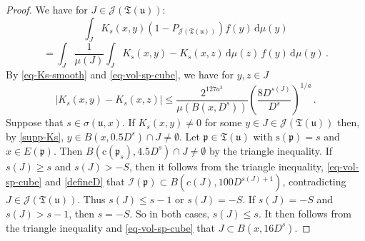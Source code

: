 \documentclass[10pt,a4paper]{article}
\theoremstyle{plain}
\theoremstyle{definition}
\numberwithin{equation}{subsection}
\newcommand{\fp}{{\mathfrak p}}
\newcommand{\fu}{{\mathfrak u}}
\newcommand{\fT}{{\mathfrak T}}
\newcommand{\pc}{{\mathrm{c}}}
\newcommand{\ps}{{\mathrm{s}}}
\newcommand{\scI}{{\mathcal{I}}} %
\newcommand{\leanok}{}
\begin{document}
\begin{proof}
    \leanok
    We have for $J \in \mathcal{J}(\fT(\fu))$:
    $$
        \int_J K_{s}(x,y)(1 - P_{\mathcal{J}(\fT(\fu))})f(y) \, \mathrm{d}\mu(y)
    $$
    \begin{equation}
    \label{eq-canc-comp}
        = \int_J \frac{1}{\mu(J)} \int_J K_s(x,y) - K_s(x,z) \, \mathrm{d}\mu(z) \,f(y) \, \mathrm{d}\mu(y)\,.
    \end{equation}
    By \eqref{eq-Ks-smooth} and \eqref{eq-vol-sp-cube}, we have for $y, z \in J$
    $$
        |K_s(x,y) - K_s(x,z)| \le \frac{2^{127a^3}}{\mu(B(x, D^s))} \left(\frac{8 D^{s(J)}}{D^s}\right)^{1/a}\,.
    $$
    Suppose that $s \in \sigma(\fu, x)$.
    If $K_s(x,y) \ne 0$ for some $y \in J \in \mathcal{J}(\fT(\fu))$ then, by \eqref{supp-Ks}, $y \in B(x, 0.5 D^s) \cap J \ne \emptyset$. Let $\fp \in \fT(\fu)$ with $\ps(\fp) = s$ and $x \in E(\fp)$. Then $B(\pc(\fp_s), 4.5D^s) \cap J \ne \emptyset$ by the triangle inequality. If $s(J) \ge s$ and $s(J) > -S$, then it follows from the triangle inequality, \eqref{eq-vol-sp-cube} and \eqref{defineD} that $\scI(\fp) \subset B(c(J), 100 D^{s(J)+1})$, contradicting $J \in \mathcal{J}(\mathfrak{T}(\fu))$. Thus $s(J) \le s - 1$ or $s(J) = -S$. If $s(J) = -S$ and $s(J) > s - 1$, then $s = -S$. So in both cases, $s(J) \le s$. It then follows from the triangle inequality and \eqref{eq-vol-sp-cube} that $J \subset B(x, 16 D^s)$.


\end{proof}
\end{document}
